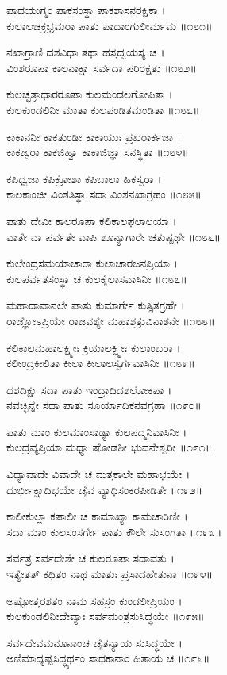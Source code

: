 ಪಾದಯುಗ್ಮಂ ಪಾಕಸಂಸ್ಥಾ ಪಾಕಶಾಸನರಕ್ಷಿಕಾ ।\\
ಕುಲಾಲಚಕ್ರಭ್ರಮರಾ ಪಾತು ಪಾದಾಂಗುಲೀರ್ಮಮ ॥೧೮೧॥

ನಖಾಗ್ರಾಣಿ ದಶವಿಧಾ ತಥಾ ಹಸ್ತದ್ವಯಸ್ಯ ಚ ।\\
ವಿಂಶರೂಪಾ ಕಾಲನಾಕ್ಷಾ ಸರ್ವದಾ ಪರಿರಕ್ಷತು ॥೧೮೨॥

ಕುಲಚ್ಛತ್ರಾಧಾರರೂಪಾ ಕುಲಮಂಡಲಗೋಪಿತಾ ।\\
ಕುಲಕುಂಡಲಿನೀ ಮಾತಾ ಕುಲಪಂಡಿತಮಂಡಿತಾ ॥೧೮೩॥

ಕಾಕಾನನೀ ಕಾಕತುಂಡೀ ಕಾಕಾಯುಃ ಪ್ರಖರಾರ್ಕಜಾ ।\\
ಕಾಕಜ್ವರಾ ಕಾಕಜಿಹ್ವಾ ಕಾಕಾಜಿಜ್ಞಾ ಸನಸ್ಥಿತಾ ॥೧೮೪॥

ಕಪಿಧ್ವಜಾ ಕಪಿಕ್ರೋಶಾ ಕಪಿಬಾಲಾ ಹಿಕಸ್ವರಾ ।\\
ಕಾಲಕಾಂಚೀ ವಿಂಶತಿಸ್ಥಾ ಸದಾ ವಿಂಶನಖಾಗ್ರಹಂ ॥೧೮೫॥

ಪಾತು ದೇವೀ ಕಾಲರೂಪಾ ಕಲಿಕಾಲಫಲಾಲಯಾ ।\\
ವಾತೇ ವಾ ಪರ್ವತೇ ವಾಪಿ ಶೂನ್ಯಾಗಾರೇ ಚತುಷ್ಪಥೇ ॥೧೮೬॥

ಕುಲೇಂದ್ರಸಮಯಾಚಾರಾ ಕುಲಾಚಾರಜನಪ್ರಿಯಾ ।\\
ಕುಲಪರ್ವತಸಂಸ್ಥಾ ಚ ಕುಲಕೈಲಾಸವಾಸಿನೀ ॥೧೮೭॥

ಮಹಾದಾವಾನಲೇ ಪಾತು ಕುಮಾರ್ಗೇ ಕುತ್ಸಿತಗ್ರಹೇ ।\\
ರಾಜ್ಞೋಽಪ್ರಿಯೇ ರಾಜವಶ್ಯೇ ಮಹಾಶತ್ರುವಿನಾಶನೇ ॥೧೮೮॥

ಕಲಿಕಾಲಮಹಾಲಕ್ಷ್ಮೀಃ ಕ್ರಿಯಾಲಕ್ಷ್ಮೀಃ ಕುಲಾಂಬರಾ ।\\
ಕಲೀಂದ್ರಕೀಲಿತಾ ಕೀಲಾ ಕೀಲಾಲಸ್ವರ್ಗವಾಸಿನೀ ॥೧೮೯॥

ದಶದಿಕ್ಷು ಸದಾ ಪಾತು ಇಂದ್ರಾದಿದಶಲೋಕಪಾ ।\\
ನವಚ್ಛಿನ್ನೇ ಸದಾ ಪಾತು ಸೂರ್ಯಾದಿಕನವಗ್ರಹಾ ॥೧೯೦॥

ಪಾತು ಮಾಂ ಕುಲಮಾಂಸಾಢ್ಯಾ ಕುಲಪದ್ಮನಿವಾಸಿನೀ ।\\
ಕುಲದ್ರವ್ಯಪ್ರಿಯಾ ಮಧ್ಯಾ ಷೋಡಶೀ ಭುವನೇಶ್ವರೀ ॥೧೯೧॥

ವಿದ್ಯಾವಾದೇ ವಿವಾದೇ ಚ ಮತ್ತಕಾಲೇ ಮಹಾಭಯೇ ।\\
ದುರ್ಭೀಕ್ಷಾದಿಭಯೇ ಚೈವ ವ್ಯಾಧಿಸಂಕರಪೀಡಿತೇ ॥೧೯೨॥

ಕಾಲೀಕುಲ್ಲಾ ಕಪಾಲೀ ಚ ಕಾಮಾಖ್ಯಾ ಕಾಮಚಾರಿಣೀ ।\\
ಸದಾ ಮಾಂ ಕುಲಸಂಸರ್ಗೇ ಪಾತು ಕೌಲೇ ಸುಸಂಗತಾ ॥೧೯೩॥

ಸರ್ವತ್ರ ಸರ್ವದೇಶೇ ಚ ಕುಲರೂಪಾ ಸದಾವತು ।\\
ಇತ್ಯೇತತ್ ಕಥಿತಂ ನಾಥ ಮಾತುಃ ಪ್ರಸಾದಹೇತುನಾ ॥೧೯೪॥

ಅಷ್ಟೋತ್ತರಶತಂ ನಾಮ ಸಹಸ್ರಂ ಕುಂಡಲೀಪ್ರಿಯಂ ।\\
ಕುಲಕುಂಡಲಿನೀದೇವ್ಯಾಃ ಸರ್ವಮಂತ್ರಸುಸಿದ್ಧಯೇ ॥೧೯೫॥

ಸರ್ವದೇವಮನೂನಾಂಚ ಚೈತನ್ಯಾಯ ಸುಸಿದ್ಧಯೇ ।\\
ಅಣಿಮಾದ್ಯಷ್ಟಸಿದ್ಧ್ಯರ್ಥಂ ಸಾಧಕಾನಾಂ ಹಿತಾಯ ಚ ॥೧೯೬॥

